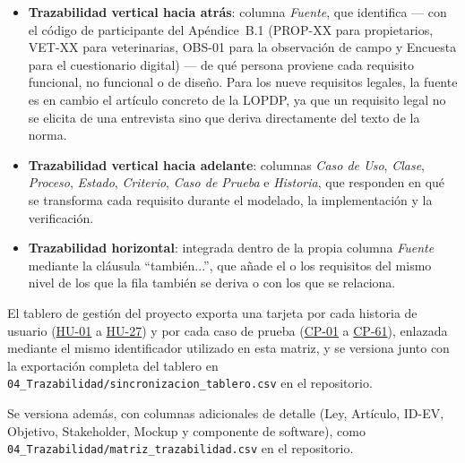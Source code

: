 \documentclass[journal,onecolumn]{IEEEtran}
\begin{document}
\begin{itemize}[leftmargin=*]
	\item \textbf{Trazabilidad vertical hacia atrás}: columna \emph{Fuente},
	que identifica --- con el código de participante del Apéndice~B.1
	(PROP-XX para propietarios, VET-XX para veterinarias, OBS-01 para la
	observación de campo y Encuesta para el cuestionario digital) --- de qué
	persona proviene cada requisito funcional, no funcional o de diseño. Para
	los nueve requisitos legales, la fuente es en cambio el artículo concreto
	de la LOPDP, ya que un requisito legal no se elicita de una entrevista
	sino que deriva directamente del texto de la norma.
	\item \textbf{Trazabilidad vertical hacia adelante}: columnas \emph{Caso
	de Uso}, \emph{Clase}, \emph{Proceso}, \emph{Estado}, \emph{Criterio},
	\emph{Caso de Prueba} e \emph{Historia}, que responden en qué se
	transforma cada requisito durante el modelado, la implementación y la
	verificación.
	\item \textbf{Trazabilidad horizontal}: integrada dentro de la propia
	columna \emph{Fuente} mediante la cláusula \enquote{también...}, que
	añade el o los requisitos del mismo nivel de los que la fila también se
	deriva o con los que se relaciona.
\end{itemize}

El tablero de gestión del proyecto exporta una tarjeta por cada historia
de usuario (\hyperref[tab:HU-01]{HU-01} a \hyperref[tab:HU-27]{HU-27}) y por cada caso de prueba (\hyperref[tab:CP-01]{CP-01} a \hyperref[cp:61]{CP-61}),
enlazada mediante el mismo identificador utilizado en esta matriz, y se
versiona junto con la exportación completa del tablero en
\texttt{04\_Trazabilidad/sincronizacion\_tablero.csv} en el repositorio.


Se versiona además, con columnas adicionales de detalle (Ley, Artículo,
ID-EV, Objetivo, Stakeholder, Mockup y componente de software), como
\texttt{04\_Trazabilidad/matriz\_trazabilidad.csv} en el repositorio.
\end{document}
